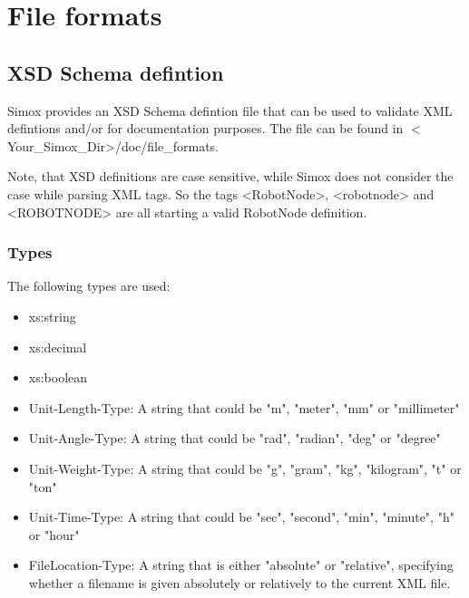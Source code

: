 \section{File formats}
\subsection{XSD Schema defintion}
Simox provides an XSD Schema defintion file that can be used to validate XML defintions and/or for documentation purposes. The file can be found in $<$Your\_Simox\_Dir>/doc/file\_formats.
\par
Note, that XSD definitions are case sensitive, while Simox does not consider the case while parsing XML tags. So the tags <RobotNode>, <robotnode> and <ROBOTNODE> are all starting a valid RobotNode definition. 
\subsubsection{Types}
The following types are used: 
\begin{itemize}
\item xs:string 
\item xs:decimal
\item xs:boolean 
\item Unit-Length-Type: A string that could be "m", "meter", "mm" or "millimeter"
\item Unit-Angle-Type: A string that could be "rad", "radian", "deg" or "degree"
\item Unit-Weight-Type: A string that could be "g", "gram", "kg", "kilogram", "t" or "ton"
\item Unit-Time-Type: A string that could be "sec", "second", "min", "minute", "h" or "hour"
\item FileLocation-Type: A string that is either "absolute" or "relative", specifying whether a filename is given absolutely or relatively to the current XML file. 
\end{itemize}
